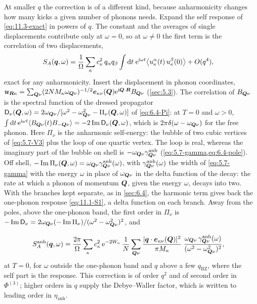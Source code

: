 At smaller $q$ the correction is of a different kind, because anharmonicity changes how many kicks a given number of phonons needs. Expand the self response of \cref{eq:11.3-exact} in powers of $q$. The constant and the averages of single displacements contribute only at $\omega = 0$, so at $\omega \neq 0$ the first term is the correlation of two displacements,
\begin{equation*}
  S_A(\bm{q},\omega) = \frac{1}{\Omega}\sum_\kappa c_\kappa^2\,q_\alpha q_\beta\int\mathrm{d} t\;\mathrm{e}^{\mathrm{i}\omega t}\bigl\langle u^\alpha_{\kappa}(t)\,u^\beta_{\kappa}(0)\bigr\rangle + O(q^4) ,
\end{equation*}
exact for any anharmonicity. Insert the displacement in phonon coordinates, $\bm{u}_{\bm{R}\kappa} = \sum_{\bm{Q}\nu}(2NM_\kappa\omega_{\bm{Q}\nu})^{-1/2}\bm{e}_{\kappa\nu}(\bm{Q})\mathrm{e}^{\mathrm{i}\bm{Q}\cdot\bm{R}}B_{\bm{Q}\nu}$ (\cref{sec:5.3}). The correlation of $B_{\bm{Q}\nu}$ is the spectral function of the dressed propagator $\mathsf{D}_\nu(\bm{Q},\omega) = 2\omega_{\bm{Q}\nu}/[\omega^2 - \omega_{\bm{Q}\nu}^2 - \Pi_\nu(\bm{Q},\omega)]$ of \cref{eq:6.4-Pi}: at $T = 0$ and $\omega > 0$, $\int\mathrm{d} t\,\mathrm{e}^{\mathrm{i}\omega t}\langle B_{\bm{Q}\nu}(t)B_{-\bm{Q}\nu}\rangle = -2\operatorname{Im}\mathsf{D}_\nu(\bm{Q},\omega)$, which is $2\pi\delta(\omega - \omega_{\bm{Q}\nu})$ for the free phonon. Here $\Pi_\nu$ is the anharmonic self-energy: the bubble of two cubic vertices of \cref{eq:5.7-V3} plus the loop of one quartic vertex. The loop is real, whereas the imaginary part of the bubble on shell is $-\omega_{\bm{Q}\nu}\gamma^{\mathrm{anh}}_{\bm{Q}\nu}$ (\cref{eq:5.7-gamma,eq:6.4-pole}). Off shell, $-\operatorname{Im}\Pi_\nu(\bm{Q},\omega) = \omega_{\bm{Q}\nu}\gamma^{\mathrm{anh}}_{\bm{Q}\nu}(\omega)$, with $\gamma^{\mathrm{anh}}_{\bm{Q}\nu}(\omega)$ the width of \cref{eq:5.7-gamma} with the energy $\omega$ in place of $\omega_{\bm{Q}\nu}$ in the delta function of the decay: the rate at which a phonon of momentum $\bm{Q}$, given the energy $\omega$, decays into two. With the branches kept separate, as in \cref{sec:6.4}, the harmonic term gives back the one-phonon response \cref{eq:11.1-S1}, a delta function on each branch. Away from the poles, above the one-phonon band, the first order in $\Pi_\nu$ is $-\operatorname{Im}\mathsf{D}_\nu = 2\omega_{\bm{Q}\nu}(-\operatorname{Im}\Pi_\nu)/(\omega^2 - \omega_{\bm{Q}\nu}^2)^2$, and
\begin{keyresult}
\begin{equation}
  S_A^{\mathrm{anh}}(\bm{q},\omega) = \frac{2\pi}{\Omega}\sum_\kappa c_\kappa^2\,\mathrm{e}^{-2W_\kappa}\,\frac1N\sum_{\bm{Q}\nu}\frac{|\bm{q}\cdot\bm{e}_{\kappa\nu}(\bm{Q})|^2}{\pi M_\kappa}\;
  \frac{\omega_{\bm{Q}\nu}\,\gamma^{\mathrm{anh}}_{\bm{Q}\nu}(\omega)}{(\omega^2 - \omega_{\bm{Q}\nu}^2)^2} ,
  \label{eq:11.5-anh}
\end{equation}
at $T = 0$, for $\omega$ outside the one-phonon band and $q$ above a few $q_{\mathrm{BZ}}$, where the self part is the response. This correction is of order $q^2$ and of second order in $\Phi^{(3)}$; higher orders in $q$ supply the Debye--Waller factor, which is written to leading order in $\eta_{\mathrm{anh}}$.
\end{keyresult}
